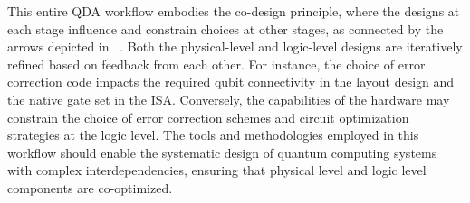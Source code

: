 \documentclass[a4paper,onecolumn,11pt,unpublished]{quantumarticle}
\begin{document}
This entire QDA workflow embodies the co-design principle, where the designs at each stage influence and constrain choices at other stages, as connected by the arrows depicted in ~. Both the physical-level and logic-level designs are iteratively refined based on feedback from each other. For instance, the choice of error correction code impacts the required qubit connectivity in the layout design and the native gate set in the ISA. Conversely, the capabilities of the hardware may constrain the choice of error correction schemes and circuit optimization strategies at the logic level. The tools and methodologies employed in this workflow should enable the systematic design of quantum computing systems with complex interdependencies, ensuring that physical level and logic level components are co-optimized.
\end{document}
